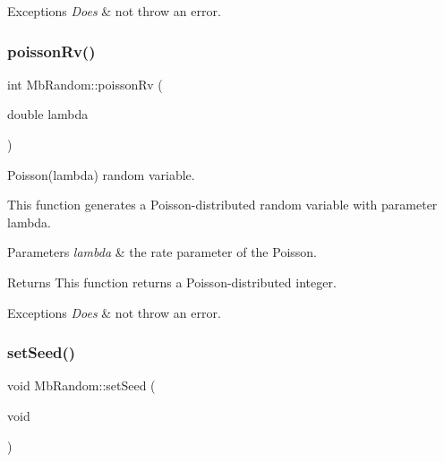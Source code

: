 \begin{DoxyExceptions}{Exceptions}
{\em Does} & not throw an error. \\
\hline
\end{DoxyExceptions}
\mbox{\label{class_mb_random_a1bdf06beaf449852a1b5247a79246b5f}} 
\subsubsection{\texorpdfstring{poissonRv()}{poissonRv()}}
{\footnotesize\ttfamily int Mb\+Random\+::poisson\+Rv (\begin{DoxyParamCaption}\item[{double}]{lambda }\end{DoxyParamCaption})}



Poisson(lambda) random variable. 

This function generates a Poisson-\/distributed random variable with parameter lambda.


\begin{DoxyParams}{Parameters}
{\em lambda} & the rate parameter of the Poisson. \\
\hline
\end{DoxyParams}
\begin{DoxyReturn}{Returns}
This function returns a Poisson-\/distributed integer. 
\end{DoxyReturn}

\begin{DoxyExceptions}{Exceptions}
{\em Does} & not throw an error. \\
\hline
\end{DoxyExceptions}
\mbox{\label{class_mb_random_a2ec0fc6f556b74b4dbac8daee90268f6}} 
\subsubsection{\texorpdfstring{setSeed()}{setSeed()}\hspace{0.1cm}{\footnotesize\ttfamily [1/2]}}
{\footnotesize\ttfamily void Mb\+Random\+::set\+Seed (\begin{DoxyParamCaption}\item[{void}]{ }\end{DoxyParamCaption})}




